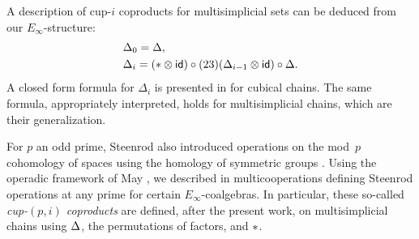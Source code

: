 A description of cup-$i$ coproducts for multisimplicial sets can be deduced from our $E_\infty$-structure:
\begin{equation} \label{e:recursive cup-i}
	\begin{split}
		& \Delta_0 = \Delta, \\
		& \Delta_i =
		(\ast \otimes \mathsf{id}) \circ (23)(\Delta_{i-1} \otimes \mathsf{id}) \circ \Delta.
	\end{split}
\end{equation}
A closed form formula for $\Delta_i$ is presented in \cite[\S4.8]{medina2021cube_einfty} for cubical chains.
The same formula, appropriately interpreted, holds for multisimplicial chains, which are their generalization.

%

For $p$ an odd prime, Steenrod also introduced operations on the mod~$p$ cohomology of spaces using the homology of symmetric groups \cite{steenrod1952reduced, steenrod1953cyclic}.
Using the operadic framework of May \cite{may1970general}, we described in \cite{medina2021may_st}
multicooperations defining Steenrod operations at any prime for certain $E_\infty$-coalgebras.
In particular, these so-called \textit{cup-$(p,i)$ coproducts} are defined, after the present work, on multisimplicial chains using $\operatorname{\Delta}$, the permutations of factors, and $\operatorname{\ast}$.
